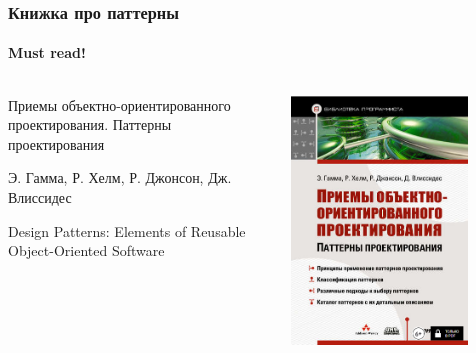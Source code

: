 \documentclass{../cscslides}
\begin{document}
    \begin{frame}
        \frametitle{Книжка про паттерны}
        \framesubtitle{Must read!}

        \begin{columns}
            \begin{column}{0.6\textwidth}
                Приемы объектно-ориентированного проектирования. Паттерны проектирования

                Э. Гамма, Р. Хелм, Р. Джонсон, Дж. Влиссидес

                Design Patterns: Elements of Reusable Object-Oriented Software
            \end{column}
            \begin{column}{0.4\textwidth}
                \begin{center}
                    \includegraphics[width=0.8\textwidth]{patternBookCover.png}
                \end{center}
            \end{column}
        \end{columns}
    \end{frame}
\end{document}
